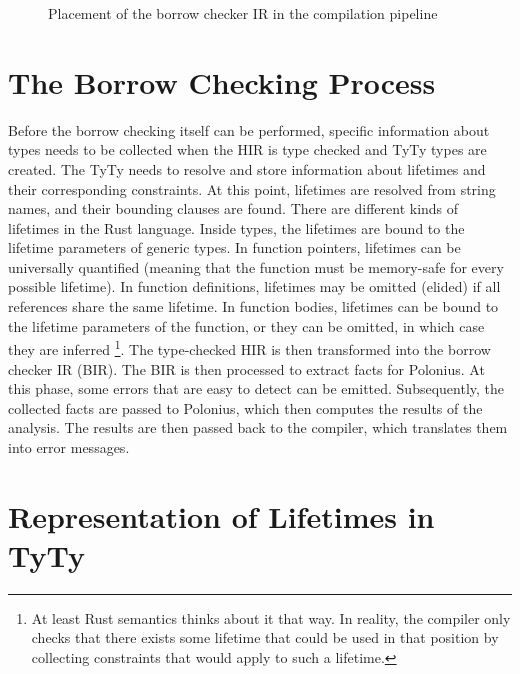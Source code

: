 \documentclass[
  11pt,
  twoside]{report}
\begin{document}
\begin{figure}
\centering

\caption{Placement of the borrow checker IR in the compilation pipeline}
\end{figure}

\section{The Borrow Checking
Process}\label{sec:the-borrow-checking-process}

Before the borrow checking itself can be performed, specific information
about types needs to be collected when the HIR is type checked and TyTy
types are created. The TyTy needs to resolve and store information about
lifetimes and their corresponding constraints. At this point, lifetimes
are resolved from string names, and their bounding clauses are found.
There are different kinds of lifetimes in the Rust language. Inside
types, the lifetimes are bound to the lifetime parameters of generic
types. In function pointers, lifetimes can be universally quantified
(meaning that the function must be memory-safe for every possible
lifetime). In function definitions, lifetimes may be omitted (elided) if
all references share the same lifetime. In function bodies, lifetimes
can be bound to the lifetime parameters of the function, or they can be
omitted, in which case they are inferred \footnote{At least Rust
  semantics thinks about it that way. In reality, the compiler only
  checks that there exists some lifetime that could be used in that
  position by collecting constraints that would apply to such a
  lifetime.}. The type-checked HIR is then transformed into the borrow
checker IR (BIR). The BIR is then processed to extract facts for
Polonius. At this phase, some errors that are easy to detect can be
emitted. Subsequently, the collected facts are passed to Polonius, which
then computes the results of the analysis. The results are then passed
back to the compiler, which translates them into error messages.

\section{Representation of Lifetimes in
TyTy}\label{sec:representation-of-lifetimes-in-tyty}
\end{document}
